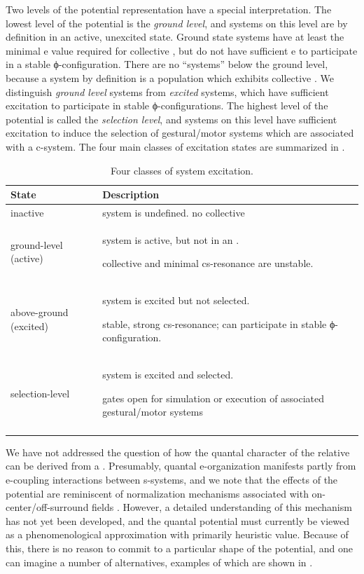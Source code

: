   Two levels of the potential representation have a special  interpretation. The lowest level of the potential is the \textit{ground level}, and systems on this level are by definition in an active, unexcited state. Ground state systems have at least the minimal e value required for collective , but do not have sufficient e to participate in a stable ϕ-configuration. There are no “systems” below the ground level, because a system by definition is a population which exhibits collective . We distinguish \textit{ground level} systems from \textit{excited} systems, which have sufficient excitation to participate in stable ϕ-configurations. The highest level of the potential is called the \textit{selection level}, and systems on this level have sufficient excitation to induce the selection of gestural/motor systems which are associated with a c-system. The four main classes of excitation states are summarized in {}.

\begin{table}
\begin{tabularx}{\textwidth}{lQ}
\lsptoprule
State & Description\\
\midrule 
inactive & system is undefined. no collective \\
ground-level (active) & system is active, but not in an .

collective  and minimal cs-resonance are unstable.\\
above-ground (excited) & system is excited but not selected.

stable, strong cs-resonance; can participate in stable ϕ-configuration.\\
selection-level & system is excited and selected.

gates open for simulation or execution of associated gestural/motor systems\\
\lspbottomrule
\end{tabularx}
\caption{Four classes of system excitation.}\label{tab:1:2}
\end{table}
 
 We have not addressed the question of how the quantal character of the relative  can be derived from a . Presumably, quantal e-organization manifests partly from e-coupling interactions between s-systems, and we note that the effects of the potential are reminiscent of normalization mechanisms associated with on-center/off-surround fields \citep{Grossberg1978,Grossberg1987}. However, a detailed understanding of this mechanism has not yet been developed, and the quantal potential must currently be viewed as a phenomenological approximation with primarily heuristic value. Because of this, there is no reason to commit to a particular shape of the potential, and one can imagine a number of alternatives, examples of which are shown in {}.

